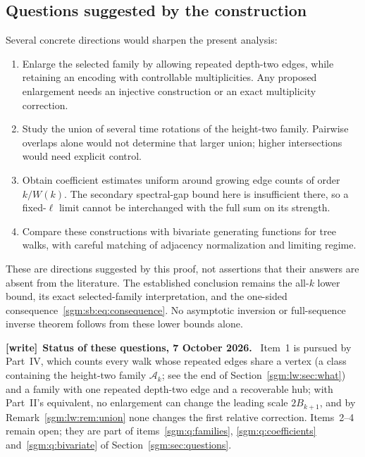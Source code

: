 \documentclass[11pt,letterpaper]{article}
\theoremstyle{remark}\newtheorem{remark}[theorem]{Remark}
\newcommand{\Ac}{\mathcal A}
\newenvironment{writenote}[1][]{\par\smallskip\begingroup\small
 \noindent\textbf{[write]}\if\relax\detokenize{#1}\relax\else~\textbf{#1.}\fi\ }%
 {\par\endgroup\smallskip}
\theoremstyle{definition}\newtheorem{definition}[theorem]{Definition}
\begin{document}
\subsection{Questions suggested by the construction}
Several concrete directions would sharpen the present analysis:
\begin{enumerate}
\item Enlarge the selected family by allowing repeated depth-two edges, while retaining an encoding with controllable multiplicities. Any proposed enlargement needs an injective construction or an exact multiplicity correction.
\item Study the union of several time rotations of the height-two family. Pairwise overlaps alone would not determine that larger union; higher intersections would need explicit control.
\item Obtain coefficient estimates uniform around growing edge counts of order $k/W(k)$. The secondary spectral-gap bound here is insufficient there, so a fixed-$\ell$ limit cannot be interchanged with the full sum on its strength.
\item Compare these constructions with bivariate generating functions for tree walks, with careful matching of adjacency normalization and limiting regime.
\end{enumerate}
These are directions suggested by this proof, not assertions that their answers are absent from the literature. The established conclusion remains the all-$k$ lower bound, its exact selected-family interpretation, and the one-sided consequence~\eqref{sgm:sb:eq:consequence}. No asymptotic inversion or full-sequence inverse theorem follows from these lower bounds alone.

\begin{writenote}[Status of these questions, 7 October 2026]
Item~1 is pursued by Part~IV, which counts every walk whose repeated edges share a vertex (a class containing the height-two family $\Ac_k$; see the end of Section~\ref{sgm:lw:sec:what}) and a family with one repeated depth-two edge and a recoverable hub; with Part~II's equivalent, no enlargement can change the leading scale $2B_{k+1}$, and by Remark~\ref{sgm:lw:rem:union} none changes the first relative correction. Items~2--4 remain open; they are part of items~\ref{sgm:q:families}, \ref{sgm:q:coefficients} and~\ref{sgm:q:bivariate} of Section~\ref{sgm:sec:questions}.
\end{writenote}
\end{document}
